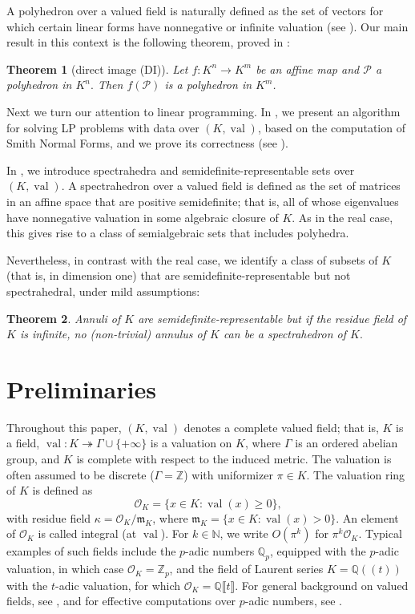 \documentclass[sigconf]{acmart}
\newcommand{\N}{\mathbb{N}} %
\newcommand{\PP}{\mathcal{P}}
\newtheorem{theorem}{Theorem}[section]
\DeclareMathOperator{\val}{val}
\def\QQ{\ensuremath{\mathbb{Q}}}
\def\ZZ{\ensuremath{\mathbb{Z}}}
\newcommand{\OK}{\mathcal{O}_K}
\begin{document}
A polyhedron over a valued field is naturally defined as the set of vectors for which certain
linear forms have nonnegative or infinite valuation (see ). Our main result in this
context is the following theorem, proved in :

\begin{theorem}[direct image (DI)] \label{theo:DI}
Let $f : K^n \to K^m$ be an affine map and $\PP$ a polyhedron in $K^n.$
Then $f(\PP)$ is a polyhedron in $K^m$.
\end{theorem}

Next we turn our attention to linear programming. In , we present
an algorithm for solving LP problems with data over $(K,\val)$, based on the computation of 
Smith Normal Forms, and we prove its correctness (see ).

In , we introduce spectrahedra and semidefinite-re\-pre\-sen\-ta\-ble sets
over $(K,\val)$. A spectrahedron over a valued field is defined as the set of matrices
in an affine space that are positive semidefinite; that is, all of whose eigenvalues
have nonnegative valuation in some algebraic closure of $K$. As in the real case, this gives rise
to a class of semialgebraic sets that includes polyhedra.

Nevertheless, in contrast with the real case, we identify a class of subsets of $K$
(that is, in dimension one) that are semidefinite-representable but not spectrahedral, 
under mild assumptions:

\begin{theorem}\label{main_2}
Annuli of $K$ are semidefinite-representable but if the residue field of $K$ is infinite, no (non-trivial) annulus of $K$ can be a spectrahedron of $K.$
\end{theorem}


\section{Preliminaries}
\label{sec:prelim}

Throughout this paper, $(K,\val)$ denotes a complete valued field; that is, $K$ is a field,
$\val : K \twoheadrightarrow \Gamma \cup \{+\infty\}$ is a valuation on $K$, where $\Gamma$ 
is an ordered abelian group, and $K$ is complete with respect to the induced metric.
The valuation is often assumed to be discrete ($\Gamma=\ZZ$)
with uniformizer $\pi \in K$. The valuation ring of $K$ is defined as
$$
\OK = \{x \in K : \val(x) \geq 0\},
$$
with residue field $\kappa = \OK/\mathfrak{m}_K$, where
$\mathfrak{m}_K = \{x \in K : \val(x) > 0\}$.
An element of $\OK$ is called integral (at $\val$).
For $k \in \N$, we write $O(\pi^k)$ for $\pi^k \OK$.
Typical examples of such fields include the $p$-adic numbers 
$\QQ_p$, equipped with the $p$-adic valuation, in which case $\OK = \ZZ_p$, 
and the field of Laurent series
$K=\QQ(\!(t)\!)$ with the $t$-adic valuation,
for which $\OK = \QQ \llbracket t \rrbracket$.
For general background on valued fields, see \cite{Serre:1979,engler2005valued},
and for effective computations over $p$-adic numbers, see \cite{caruso_computations_2017}.
\end{document}

